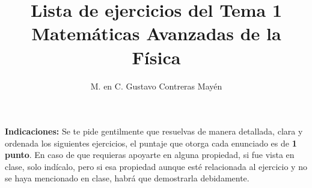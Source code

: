 

\title{Lista de ejercicios del Tema 1 \\[0.3em]  \large{Matemáticas Avanzadas de la Física}\vspace{-3ex}}
\author{M. en C. Gustavo Contreras Mayén}
\date{ }

\vspace{-4cm}
\maketitle

\fontsize{14}{14}\selectfont

\textbf{Indicaciones: } Se te pide gentilmente que resuelvas de manera detallada, clara y ordenada los siguientes ejercicios, el puntaje que otorga cada enunciado es de \textbf{1 punto}. En caso de que requieras apoyarte en alguna propiedad, si fue vista en clase, solo indícalo, pero si esa propiedad aunque esté relacionada al ejercicio y no se haya mencionado en clase, habrá que demostrarla debidamente.

